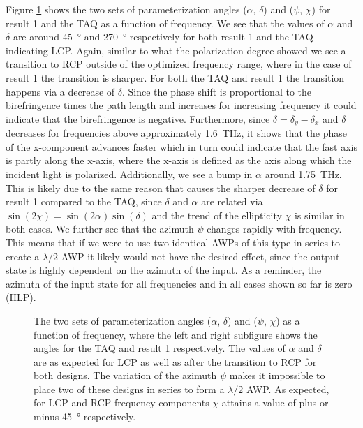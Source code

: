 Figure \ref{fig:cl4_params} shows the two sets of parameterization angles ($\alpha$, $\delta$) and ($\psi$, $\chi$) for result 1 and the TAQ as a function of frequency. We see that the values of $\alpha$ and $\delta$ are around \SI{45}{\degree} and \SI{270}{\degree} respectively for both result 1 and the TAQ indicating LCP. Again, similar to what the polarization degree showed we see a transition to RCP outside of the optimized frequency range, where in the case of result 1 the transition is sharper. For both the TAQ and result 1 the transition happens via a decrease of $\delta$. Since the phase shift is proportional to the birefringence times the path length and increases for increasing frequency it could indicate that the birefringence is negative. Furthermore, since $\delta = \delta_y - \delta_x$ and $\delta$ decreases for frequencies above approximately \SI{1.6}{\tera \hertz}, it shows that the phase of the x-component advances faster which in turn could indicate that the fast axis is partly along the x-axis, where the x-axis is defined as the axis along which the incident light is polarized. Additionally, we see a bump in $\alpha$ around \SI{1.75}{\tera \hertz}. This is likely due to the same reason that causes the sharper decrease of $\delta$ for result 1 compared to the TAQ, since $\delta$ and $\alpha$ are related via $\sin(2\chi)=\sin(2\alpha)\sin(\delta)$ and the trend of the ellipticity $\chi$ is similar in both cases. We further see that the azimuth $\psi$ changes rapidly with frequency. This means that if we were to use two identical AWPs of this type in series to create a $\lambda/2$ AWP it likely would not have the desired effect, since the output state is highly dependent on the azimuth of the input. As a reminder, the azimuth of the input state for all frequencies and in all cases shown so far is zero (HLP).

\begin{figure}[ht]
    \centering
    
    \caption{The two sets of parameterization angles ($\alpha$, $\delta$) and ($\psi$, $\chi$) as a function of frequency, where the left and right subfigure shows the angles for the TAQ and result 1 respectively. The values of $\alpha$ and $\delta$ are as expected for LCP as well as after the transition to RCP for both designs. The variation of the azimuth $\psi$ makes it impossible to place two of these designs in series to form a $\lambda/2$ AWP. As expected, for LCP and RCP frequency components $\chi$ attains a value of plus or minus \SI{45}{\degree} respectively.}
    \label{fig:cl4_params}
\end{figure}

